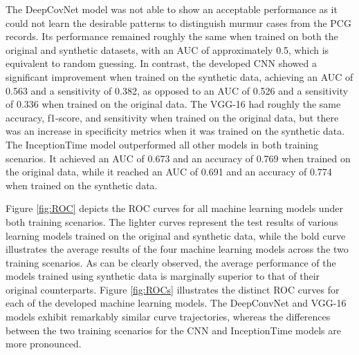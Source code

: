 \documentclass{article}
\begin{document}
\par The DeepCovNet model was not able to show an acceptable performance as it could not learn the desirable patterns to distinguish murmur cases from the PCG records. Its performance remained roughly the same when trained on both the original and synthetic datasets, with an AUC of approximately 0.5, which is equivalent to random guessing. In contrast, the developed CNN showed a significant improvement when trained on the synthetic data, achieving an AUC of 0.563 and a sensitivity of 0.382, as opposed to an AUC of 0.526 and a sensitivity of 0.336 when trained on the original data. The VGG-16 had roughly the same accuracy, f1-score, and sensitivity when trained on the original data, but there was an increase in specificity metrics when it was trained on the synthetic data. The InceptionTime model outperformed all other models in both training scenarios. It achieved an AUC of 0.673 and an accuracy of 0.769 when trained on the original data, while it reached an AUC of 0.691 and an accuracy of 0.774 when trained on the synthetic data.

\par Figure \ref{fig:ROC} depicts the ROC curves for all machine learning models under both training scenarios. The lighter curves represent the test results of various learning models trained on the original and synthetic data, while the bold curve illustrates the average results of the four machine learning models across the two training scenarios. As can be clearly observed, the average performance of the models trained using synthetic data is marginally superior to that of their original counterparts. Figure \ref{fig:ROCs} illustrates the distinct ROC curves for each of the developed machine learning models. The DeepConvNet and VGG-16 models exhibit remarkably similar curve trajectories, whereas the differences between the two training scenarios for the CNN and InceptionTime models are more pronounced.
\end{document}
